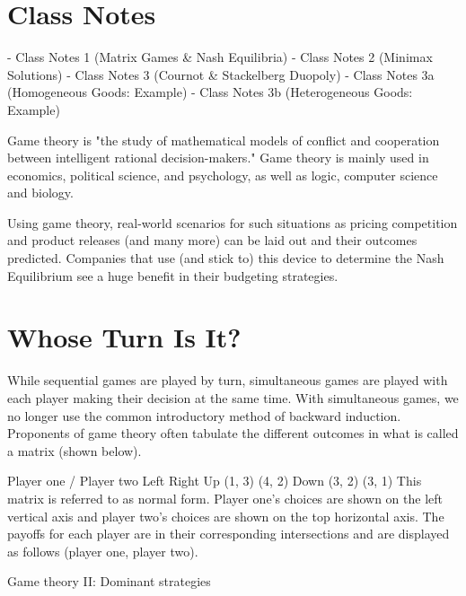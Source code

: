

\section{Class Notes}

- Class Notes 1 (Matrix Games & Nash Equilibria)
- Class Notes 2 (Minimax Solutions)
- Class Notes 3 (Cournot & Stackelberg Duopoly)
- Class Notes 3a (Homogeneous Goods: Example)
- Class Notes 3b (Heterogeneous Goods: Example)





Game theory is "the study of mathematical models of conflict and cooperation between intelligent rational decision-makers." Game theory is mainly used in economics, political science, and psychology, as well as logic, computer science and biology.




Using game theory, real-world scenarios for such situations as pricing competition and 
product releases (and many more) can be laid out and their outcomes predicted. 
Companies that use (and stick to) this device to determine the Nash Equilibrium see a 
huge benefit in their budgeting strategies.

\section{Whose Turn Is It?}
While sequential games are played by turn, simultaneous games are played with each player making their decision at the same time. With simultaneous games, we no longer use the common introductory method of backward induction. Proponents of game theory often tabulate the different outcomes in what is called a matrix (shown below).

Player one / Player two	Left	Right
Up	(1, 3)	(4, 2)
Down	(3, 2)	(3, 1)
This matrix is referred to as normal form. Player one's choices are shown on the left vertical axis and player two's choices are shown on the top horizontal axis. The payoffs for each player are in their corresponding intersections and are displayed as follows (player one, player two).



Game theory II: Dominant strategies

